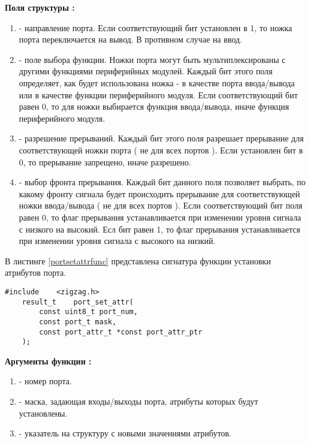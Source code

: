 {\bfseries Поля структуры :}

{\itshape
\begin{enumerate}
\item {} - направление порта. Если соответствующий бит установлен в 1, то ножка
порта переключается на вывод. В противном случае на ввод.
\item {} - поле выбора функции. Ножки порта могут быть мультиплексированы с другими функциями
периферийных модулей. Каждый бит этого поля определяет, как будет использована ножка - в качестве порта
ввода/вывода или в качестве функции периферийного модуля. Если соответствующий бит равен 0, то для 
ножки выбирается функция ввода/вывода, иначе функция периферийного модуля.
\item {} - разрешение прерываний. Каждый бит этого поля разрешает прерывание для соответствующей 
ножки порта ( не для всех портов ). Если установлен бит в 0, то прерывание запрещено, иначе разрешено.
\item {} - выбор фронта прерывания. Каждый бит данного поля позволяет выбрать, по какому фронту 
сигнала будет происходить прерывание для соответствующей ножки ввода/вывода ( не для всех портов ).
Если соответствующий бит поля равен 0, то флаг прерывания устанавливается при изменении уровня сигнала с
низкого на высокий. Есл бит равен 1, то флаг прерывания устанавливается при изменении уровня сигнала с
высокого на низкий.
\end{enumerate}
}

В листинге \ref{portsetattrfunc} представлена сигнатура функции установки атрибутов порта.

\begin{lstlisting}[caption=\myarg{port\_set\_attr()} - установка атрибутов порта, label=portsetattrfunc ]
    #include    <zigzag.h>
    result_t    port_set_attr( 
        const uint8_t port_num, 
        const port_t mask, 
        const port_attr_t *const port_attr_ptr 
    );
\end{lstlisting}

{\bfseries Аргументы функции :}

{\itshape
\begin{enumerate}
\item {} - номер порта.
\item {} - маска, задающая входы/выходы порта, атрибуты которых будут установлены.
\item {} - указатель на структуру с новыми значениями атрибутов.
\end{enumerate}
}

